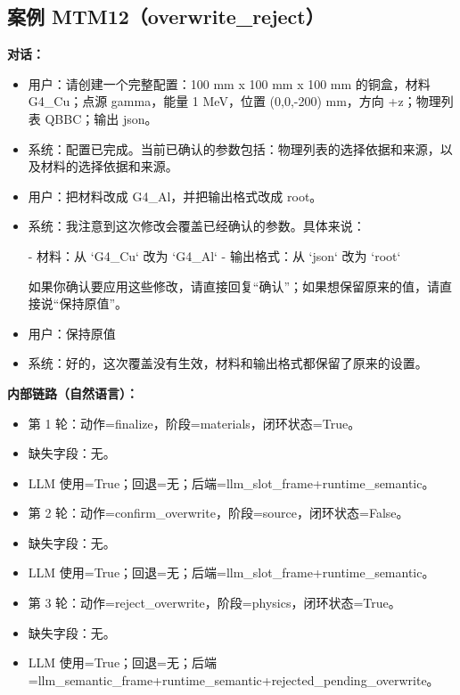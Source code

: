 \documentclass[11pt]{ctexart}
\begin{document}
\subsection{案例 MTM12（overwrite\_reject）}
\textbf{对话：}
\begin{itemize}
\item 用户：请创建一个完整配置：100 mm x 100 mm x 100 mm 的铜盒，材料 G4\_Cu；点源 gamma，能量 1 MeV，位置 (0,0,-200) mm，方向 +z；物理列表 QBBC；输出 json。
\item 系统：配置已完成。当前已确认的参数包括：物理列表的选择依据和来源，以及材料的选择依据和来源。
\item 用户：把材料改成 G4\_Al，并把输出格式改成 root。
\item 系统：我注意到这次修改会覆盖已经确认的参数。具体来说：

- 材料：从 `G4\_Cu` 改为 `G4\_Al`
- 输出格式：从 `json` 改为 `root`

如果你确认要应用这些修改，请直接回复“确认”；如果想保留原来的值，请直接说“保持原值”。
\item 用户：保持原值
\item 系统：好的，这次覆盖没有生效，材料和输出格式都保留了原来的设置。
\end{itemize}
\textbf{内部链路（自然语言）：}
\begin{itemize}
\item 第 1 轮：动作=finalize，阶段=materials，闭环状态=True。
\item 缺失字段：无。
\item LLM 使用=True；回退=无；后端=llm\_slot\_frame+runtime\_semantic。
\item 第 2 轮：动作=confirm\_overwrite，阶段=source，闭环状态=False。
\item 缺失字段：无。
\item LLM 使用=True；回退=无；后端=llm\_slot\_frame+runtime\_semantic。
\item 第 3 轮：动作=reject\_overwrite，阶段=physics，闭环状态=True。
\item 缺失字段：无。
\item LLM 使用=True；回退=无；后端=llm\_semantic\_frame+runtime\_semantic+rejected\_pending\_overwrite。
\end{itemize}
\end{document}
